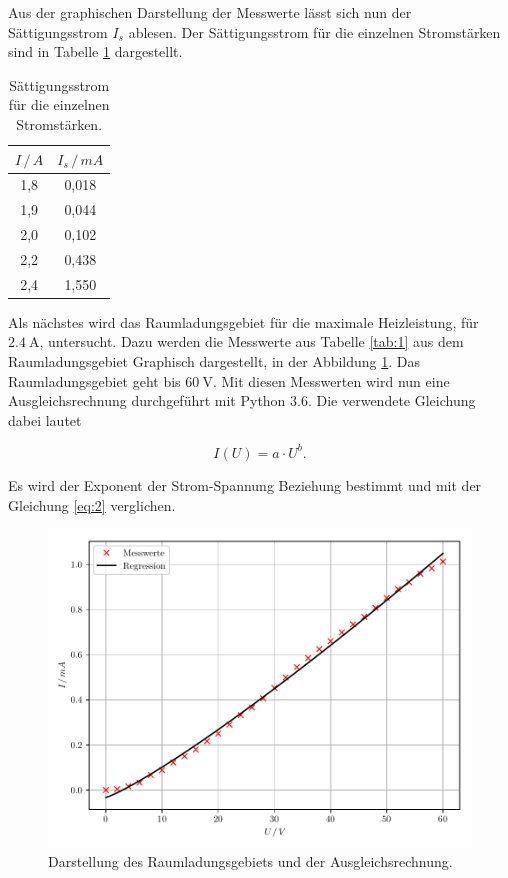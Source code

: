 Aus der graphischen Darstellung der Messwerte lässt sich nun der Sättigungsstrom
$I_s$ ablesen. Der Sättigungsstrom für die einzelnen Stromstärken sind in Tabelle
\ref{tab:2} dargestellt.

\begin{table}[H]
  \centering
  \caption{Sättigungsstrom für die einzelnen Stromstärken.}
  \label{tab:2}
  \begin{tabular}{c c}
    \toprule
    $I \, / \, A$ & $I_s \, / \, mA$ \\
    \midrule
    1,8 & 0,018  \\
    1,9 & 0,044  \\
    2,0 & 0,102  \\
    2,2 & 0,438  \\
    2,4 & 1,550  \\
    \bottomrule
  \end{tabular}
\end{table}

Als nächstes wird das Raumladungsgebiet für die maximale Heizleistung, für $\SI{2.4}{\ampere}$,
untersucht. Dazu werden die Messwerte aus Tabelle \ref{tab:1} aus dem Raumladungsgebiet
Graphisch dargestellt, in der Abbildung \ref{abb:7}. Das Raumladungsgebiet geht bis $\SI{60}{\volt}$.
Mit diesen Messwerten wird nun eine Ausgleichsrechnung durchgeführt mit Python 3.6.
Die verwendete Gleichung dabei lautet

\begin{equation*}
  I(U) = a \cdot U^b.
\end{equation*}

Es wird der Exponent der Strom-Spannung Beziehung bestimmt und mit der Gleichung
\ref{eq:2} verglichen.

\begin{figure}[H]
  \centering
  \includegraphics{plot2.pdf}
  \caption{Darstellung des Raumladungsgebiets und der Ausgleichsrechnung.}
  \label{abb:7}
\end{figure}

